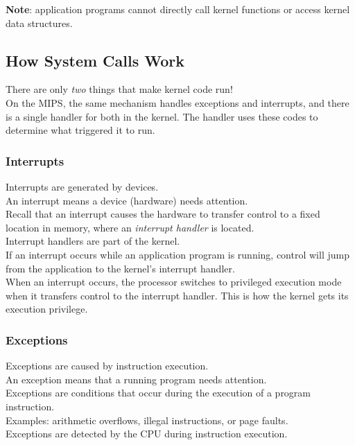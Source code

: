 \documentclass[12pt]{article}
\theoremstyle{plain}
\theoremstyle{definition}
\begin{document}
\textbf{Note}: application programs cannot directly call kernel functions or access kernel data structures.

\subsection{How System Calls Work}
There are only \emph{two} things that make kernel code run! \\

On the MIPS, the same mechanism handles exceptions and interrupts, and there is a single handler for both in the kernel.
The handler uses these codes to determine what triggered it to run.

\subsubsection{Interrupts}
Interrupts are generated by devices. \\
An interrupt means a device (hardware) needs attention. \\

Recall that an interrupt causes the hardware to transfer control to a fixed location in
memory, where an \emph{interrupt handler} is located. \\

Interrupt handlers are part of the kernel. \\
If an interrupt occurs while an application program is running, control will jump from the application to the kernel's interrupt handler. \\

When an interrupt occurs, the processor switches to privileged execution mode when it transfers control to the interrupt handler.
This is how the kernel gets its execution privilege.

\subsubsection{Exceptions}
Exceptions are caused by instruction execution. \\
An exception means that a running program needs attention. \\

Exceptions are conditions that occur during the execution of a program instruction. \\
Examples: arithmetic overflows, illegal instructions, or page faults. \\

Exceptions are detected by the CPU during instruction execution. \\
\end{document}
